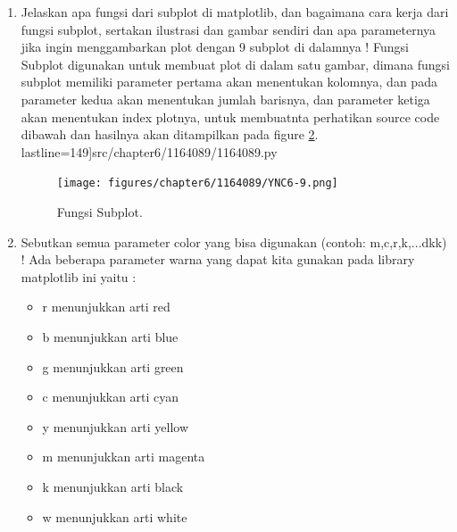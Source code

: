 \begin{enumerate}
\begin{itemize}
		\item Selanjutnya kita akan memberikan title dan nama pada setiap sumbu, gunakan source code seperti berikut,
		          lastline=130]{src/chapter6/1164089/1164089.py}

		\item Panggil fungsi legend dan tampilkan di console gunakan source code berikut,
		          lastline=133]{src/chapter6/1164089/1164089.py}

		\item Hasilnya dapat kita lihat pada figure \ref{YNC6-8}

	\end{itemize}

		\begin{figure}[!htbp!]
			\centerline{\texttt{[image: figures/chapter6/1164089/YNC6-8.png]}}
			\caption{Fungsi Legend Dan Label.}
			\label{YNC6-8}
		\end{figure}

\item Jelaskan apa fungsi dari subplot di matplotlib, dan bagaimana cara kerja dari fungsi subplot, sertakan ilustrasi dan gambar sendiri dan apa parameternya jika ingin menggambarkan plot dengan 9 subplot di dalamnya !
	\subitem Fungsi Subplot digunakan untuk membuat plot di dalam satu gambar, dimana fungsi subplot memiliki parameter pertama akan menentukan kolomnya, dan pada parameter kedua akan menentukan jumlah barisnya, dan parameter ketiga akan menentukan index plotnya, untuk membuatnta perhatikan source code dibawah dan hasilnya akan ditampilkan pada figure \ref{YNC6-9}.
	 lastline=149]{src/chapter6/1164089/1164089.py}

		\begin{figure}[!htbp!]
			\centerline{\texttt{[image: figures/chapter6/1164089/YNC6-9.png]}}
			\caption{Fungsi Subplot.}
			\label{YNC6-9}
		\end{figure}

\item Sebutkan semua parameter color yang bisa digunakan (contoh: m,c,r,k,...dkk) !
	\subitem Ada beberapa parameter warna yang dapat kita gunakan pada library matplotlib ini yaitu :
	\begin{itemize}
		\item r menunjukkan arti red
		\item b menunjukkan arti blue
		\item g menunjukkan arti green
		\item c menunjukkan arti cyan
		\item y menunjukkan arti yellow
		\item m menunjukkan arti magenta
		\item k menunjukkan arti black
		\item w menunjukkan arti white
	\end{itemize}


\end{enumerate}
